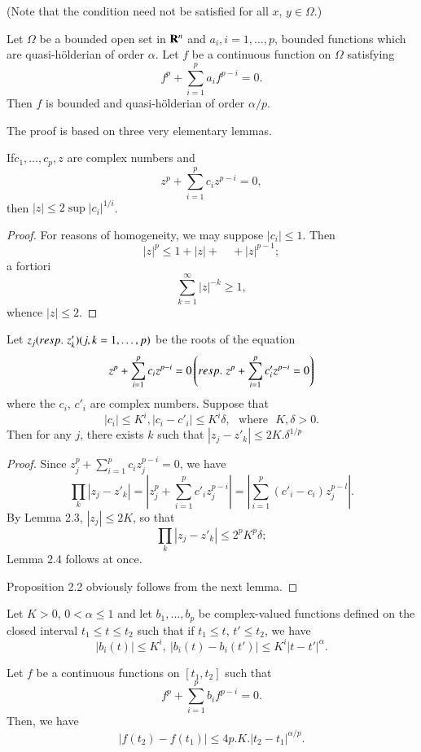 (Note that the condition need not be satisfied for all $x$, $y \in \Omega$.)

\setcounter{theorem}{1}
\begin{proposition}\label{chap4-prop2.2}%
  Let $\Omega$ be a bounded open set in $\mathbf{R}^n$ and $a_i, i =1, \ldots, p$, bounded functions which are quasi-h\"olderian of order $\alpha$. Let $f$ be a continuous function on $\Omega$ satisfying
  $$
f^{p} + \sum\limits^p_{i=1} a_i f^{p-i} = 0.
$$
Then $f$ is bounded and quasi-h\"olderian of order $\alpha/p$.
\end{proposition}

The proof is based on three  very elementary lemmas.

\begin{lemma}\label{chap4-lem2.3}%
  If\pageoriginale $c_1, \ldots, c_p, z$ are complex numbers and
  $$
z^p + \sum\limits^p_{i=1} c_i z^{p-i} = 0,
  $$
then $|z| \leq 2 \sup |c_i|^{1/i}$.
\end{lemma}

\begin{proof}
  For reasons of homogeneity, we may suppose $|c_i|\leq 1$. Then
  $$
|z|^p \leq 1+ |z| + \quad + |z|^{p-1};
$$
a fortiori
$$
\sum\limits^{\infty}_{k=1} |z|^{-k} \geq 1,
$$
whence $|z| \leq 2$.
\end{proof}

\begin{lemma}\label{chap4-lem2.4}%
  Let $z_j ({resp.}\kern.3em z'_k) (j, k =1, \ldots, p)$ be the roots of the equation
  $$
  z^p + \sum\limits^{p}_{i=1} c_i z^{p-i} = 0 \left({resp.}\kern.3em z^p + \sum\limits^p_{i=1} c'_i z^{p-i} = 0 \right)
  $$
  where the $c_i$, $c'_i$ are complex numbers. Suppose that
  $$
  |c_i| \leq K^i, |c_i - c'_i| \leq K^i \delta, \text{~ where ~} K, \delta > 0.
  $$
  Then for any $j$, there exists $k$ such that $|z_j - z'_k| \leq 2 K.\delta^{1/p}$
\end{lemma}

\begin{proof}
  Since $z^p_j + \sum\limits^p_{i=1} c_i z^{p-i}_j =0$, we have
  $$
\prod\limits_k  |z_j - z'_k| = \left|z^p_j + \sum\limits^p_{i=1} c'_i z^{p-i}_j\right| = \left|\sum\limits^p_{i=1} (c'_i - c_i) z^{p-l}_j\right|.
  $$
By Lemma 2.3, $|z_j| \leq 2K$, so that
$$
\prod\limits_k |z_j - z'_k| \leq 2^p K^p \delta ;
$$
Lemma 2.4 follows at once.

Proposition 2.2 obviously follows from the next lemma.
\end{proof}


\begin{lemma}\label{chap4-lem2.5}%
  Let $K >0$, $0 < \alpha \leq 1$ and let $b_1, \ldots, b_p$ be  complex-valued functions defined on the closed interval $t_1 \leq t \leq t_2$ such that if $t_1 \leq t$, $t'\leq t_2$, we have
  $$
  |b_i(t)| \leq K^i, ~|b_i (t) - b_i (t')| \leq K^i |t - t'|^\alpha.
  $$\pageoriginale

  Let $f$ be a continuous functions on $[t_1, t_2]$ such that
  $$
f^p + \sum\limits^p_{i=1} b_i f^{p-i} = 0.
$$
Then, we have
$$
|f(t_2) - f(t_1)| \leq 4p. K. |t_2 - t_1|^{\alpha/p}.
$$
\end{lemma}

